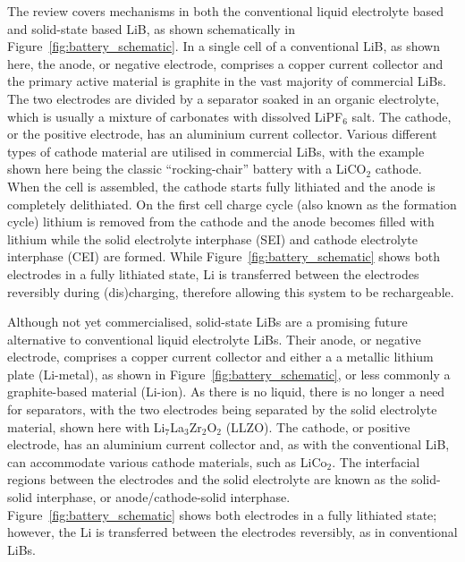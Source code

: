 \documentclass[../main.tex]{subfiles}
\begin{document}
The review covers mechanisms in both the conventional liquid electrolyte based and solid-state based LiB, as shown schematically in Figure~\ref{fig:battery_schematic}. In a single cell of a conventional LiB, as shown here, the anode, or negative electrode, comprises a copper current collector and the primary active material is graphite in the vast majority of commercial LiBs. The two electrodes are divided by a separator soaked in an organic electrolyte, which is usually a mixture of carbonates with dissolved LiPF$_{6}$ salt. The cathode, or the positive electrode, has an aluminium current collector. Various different types of cathode material are utilised in commercial LiBs, with the example shown here being the classic ``rocking-chair'' battery with a LiCO$_{2}$ cathode.\cite{Scrosati_1992} When the cell is assembled, the cathode starts fully lithiated and the anode is completely delithiated. On the first cell charge cycle (also known as the formation cycle) lithium is removed from the cathode and the anode becomes filled with lithium while the solid electrolyte interphase (SEI) and cathode electrolyte interphase (CEI) are formed. While Figure~\ref{fig:battery_schematic} shows both electrodes in a fully lithiated state, Li is transferred between the electrodes reversibly during (dis)charging, therefore allowing this system to be rechargeable.

Although not yet commercialised, solid-state LiBs are a promising future alternative to conventional liquid electrolyte LiBs. Their anode, or negative electrode, comprises a copper current collector and either a a metallic lithium plate (Li-metal), as shown in Figure~\ref{fig:battery_schematic}, or less commonly a graphite-based material (Li-ion). As there is no liquid, there is no longer a need for separators, with the two electrodes being separated by the solid electrolyte material, shown here with Li$_7$La$_3$Zr$_2$O$_2$ (LLZO). The cathode, or positive electrode, has an aluminium current collector and, as with the conventional LiB, can accommodate various cathode materials, such as LiCo$_2$. The interfacial regions between the electrodes and the solid electrolyte are known as the solid-solid interphase, or anode/cathode-solid interphase. Figure~\ref{fig:battery_schematic} shows both electrodes in a fully lithiated state; however, the Li is transferred between the electrodes reversibly, as in conventional LiBs.
\end{document}
